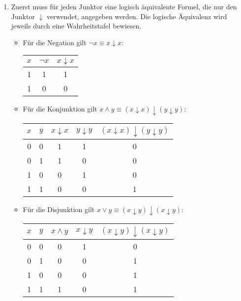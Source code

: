 \documentclass[a4paper,10pt]{article}
\begin{document}
\begin{enumerate}
\item Zuerst muss für jeden Junktor eine logisch äquivalente Formel, die nur den Junktor $\downarrow$ verwendet, angegeben werden. Die logische Äquivalenz wird jeweils durch eine Wahrheitstafel bewiesen. 
\begin{itemize}
\item Für die Negation gilt $\neg x \equiv x \downarrow x$: \\
\begin{tabular}{|c|c|c|}
\hline 
\rule[-1ex]{0pt}{2.5ex} $x$ & $\neg x$ & $x \downarrow x$ \\ 
\hline 
\rule[-1ex]{0pt}{2.5ex} 1 & 1 & 1 \\ 
\hline 
\rule[-1ex]{0pt}{2.5ex} 1 & 0 & 0 \\ 
\hline 
\end{tabular}
\item Für die Konjunktion gilt $x \wedge y \equiv (x \downarrow x) \downarrow (y \downarrow y)$: \\
\begin{tabular}{|c|c|c|c|c|}
\hline 
\rule[-1ex]{0pt}{2.5ex} $x$ & $y$ & $x \downarrow x$ & $y \downarrow y$ & $(x \downarrow x) \downarrow (y \downarrow y)$ \\ 
\hline 
\rule[-1ex]{0pt}{2.5ex} 0 & 0 & 1 & 1 & 0 \\ 
\hline 
\rule[-1ex]{0pt}{2.5ex} 0 & 1 & 1 & 0 & 0\\ 
\hline 
\rule[-1ex]{0pt}{2.5ex} 1 & 0 & 0 & 1 & 0\\ 
\hline 
\rule[-1ex]{0pt}{2.5ex} 1 & 1 & 0 & 0 & 1\\ 
\hline
\end{tabular}
\item Für die Disjunktion gilt $x \vee y \equiv (x \downarrow y) \downarrow (x \downarrow y)$: \\
 \begin{tabular}{|c|c|c|c|c|}
\hline 
\rule[-1ex]{0pt}{2.5ex} $x$ & $y$ & $x \wedge y$ & $x \downarrow y$ & $(x \downarrow y) \downarrow (x \downarrow y)$ \\ 
\hline 
\rule[-1ex]{0pt}{2.5ex} 0 & 0 & 0 & 1 & 0 \\ 
\hline 
\rule[-1ex]{0pt}{2.5ex} 0 & 1 & 0 & 0 & 1\\ 
\hline 
\rule[-1ex]{0pt}{2.5ex} 1 & 0 & 0 & 0 & 1\\ 
\hline 
\rule[-1ex]{0pt}{2.5ex} 1 & 1 & 1 & 0 & 1\\ 
\hline
\end{tabular}


\end{itemize}
\end{enumerate}
\end{document}
